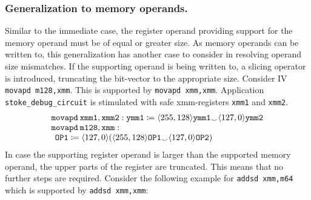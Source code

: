 \subsubsection*{Generalization to memory operands.}
Similar to the immediate case, the register operand providing support for the memory operand must be of equal or greater size. 
As memory operands can be written to, this generalization has another case to consider in resolving operand size mismatches.
If the supporting operand is being written to, a slicing operator is introduced, truncating the bit-vector to the appropriate size. 
Consider IV \texttt{movapd m128,xmm}.
This is supported by \texttt{movapd xmm,xmm}.
Application \texttt{stoke\_debug\_circuit} is stimulated with safe xmm-registers \texttt{xmm1} and \texttt{xmm2}. 
\[
\begin{array}{llcl}
\mathtt{movapd\hspace{0.5ex} xmm1, xmm2}:
	 \mathtt{ymm1} \coloneqq \langle 255,128\rangle \mathtt{ymm1} {_\smile} \langle 127,0\rangle\mathtt{ymm2}\\
\mathtt{movapd\hspace{0.5ex} m128,xmm}: \\
	 \hspace{1ex}\mathtt{OP1} \coloneqq \langle 127,0\rangle(\langle 255,128\rangle \mathtt{OP1} {_\smile} \langle 127,0\rangle\mathtt{OP2})
\end{array}
\]
In case the supporting register operand is larger than the supported memory operand, the upper parts of the register are truncated.
This means that no further steps are required.
Consider the following example for \texttt{addsd xmm,m64} which is supported by \texttt{addsd xmm,xmm}:
